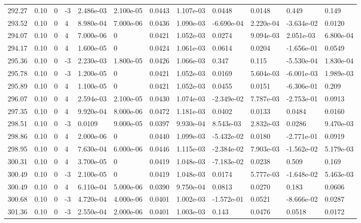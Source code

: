 \documentclass[preview]{standalone}
\begin{document}
{{{{{{{{{{{{{{\begin{tabular}{L{1.2cm}C{1.2cm} C{0.3cm}C{0.5cm} C{1.4cm}C{1.4cm} C{1.4cm}C{1.4cm} C{1.6cm}C{1.6cm} C{1.6cm}C{1.6cm}}
  292.27  &  0.10  & 0     & -3 &  2.486e-03  & 2.100e-05  &  0.0443&   1.107e-03& 0.0448 & 0.0148   &  0.449 & 0.149  \\ 
  293.52  &  0.10  & 0     &  4 &  8.980e-04  & 7.000e-06  &  0.0436&   1.090e-03& -6.690e-04 & 2.220e-04   &  -3.634e-02 & 0.0120  \\ 
  294.07  &  0.10  & 0     &  4 &  7.000e-06  & 0  &  0.0421&   1.052e-03& 0.0274 & 9.094e-03   &  2.051e-03 & 6.800e-04  \\ 
  294.17  &  0.10  & 0     &  4 &  1.600e-05  & 0  &  0.0424&   1.061e-03& 0.0614 & 0.0204   &  -1.656e-01 & 0.0549  \\ 
  295.36  &  0.10  & 0     & -3 &  2.230e-03  & 1.800e-05  &  0.0426&   1.066e-03& 0.347 & 0.115   &  -5.530e-04 & 1.830e-04  \\ 
  295.78  &  0.10  & 0     & -3 &  1.200e-05  & 0  &  0.0421&   1.052e-03& 0.0169 & 5.604e-03   &  -6.001e-03 & 1.989e-03  \\ 
  295.89  &  0.10  & 0     &  4 &  1.100e-05  & 0  &  0.0421&   1.052e-03& 0.0455 & 0.0151   &  -6.306e-01 & 0.209  \\ 
  296.07  &  0.10  & 0     &  4 &  2.594e-03  & 2.100e-05  &  0.0430&   1.074e-03& -2.349e-02 & 7.787e-03   &  -2.753e-01 & 0.0913  \\ 
  297.35  &  0.10  & 0     &  4 &  9.920e-04  & 8.000e-06  &  0.0472&   1.181e-03& 0.0402 & 0.0133   &  0.0484 & 0.0160  \\ 
  298.51  &  0.10  & 0     & -3 &  0.0109  & 9.000e-05  &  0.0397&   9.930e-04& 8.543e-03 & 2.832e-03   &  0.0286 & 9.470e-03  \\ 
  298.86  &  0.10  & 0     &  4 &  2.000e-06  & 0  &  0.0440&   1.099e-03& -5.432e-02 & 0.0180   &  -2.771e-01 & 0.0919  \\ 
  298.95  &  0.10  & 0     &  4 &  7.630e-04  & 6.000e-06  &  0.0446&   1.115e-03& -2.384e-02 & 7.903e-03   &  -1.562e-02 & 5.179e-03  \\ 
  300.31  &  0.10  & 0     &  4 &  3.700e-05  & 0  &  0.0419&   1.048e-03& -7.183e-02 & 0.0238   &  0.509 & 0.169  \\ 
  300.49  &  0.10  & 0     & -3 &  2.100e-05  & 0  &  0.0419&   1.048e-03& 0.0174 & 5.777e-03   &  -1.648e-02 & 5.463e-03  \\ 
  300.49  &  0.10  & 0     &  4 &  6.110e-04  & 5.000e-06  &  0.0390&   9.750e-04& 0.0813 & 0.0270   &  0.183 & 0.0606  \\ 
  300.68  &  0.10  & 0     & -3 &  4.720e-04  & 4.000e-06  &  0.0401&   1.002e-03& -1.572e-01 & 0.0521   &  -8.666e-02 & 0.0287  \\ 
  301.36  &  0.10  & 0     & -3 &  2.550e-04  & 2.000e-06  &  0.0401&   1.003e-03& 0.143 & 0.0476   &  0.0518 & 0.0172  \\ 
\hline 
\end{tabular} 

}}}}}}}}}}}}}}
\end{document}
